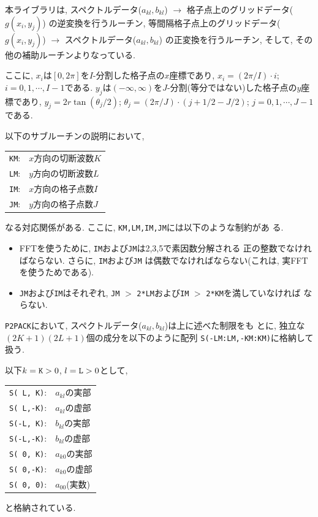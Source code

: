 \documentclass[a4j,fleqn]{jarticle}
\begin{document}
本ライブラリは, 
スペクトルデータ($a_{kl},b_{kl}$) 
$\to$ 格子点上のグリッドデータ($g(x_i,y_j)$) 
の逆変換を行うルーチン,
等間隔格子点上のグリッドデータ($g(x_i,y_j)$) 
$\to$ スペクトルデータ($a_{kl},b_{kl}$) 
の正変換を行うルーチン, 
そして, その他の補助ルーチンよりなっている.

ここに, $x_i$は$[0,2\pi]$を$I$-分割した格子点の$x$座標であり,
$x_i=(2\pi/I)\cdot i$;  $i=0,1,\cdots,I-1$である.
$y_j$は$(-\infty,\infty)$を$J$-分割(等分ではない)した格子点の$y$座標であり,
$y_j=2r\tan(\theta_j/2)$;
$\theta_j=(2\pi/J)\cdot(j+1/2-J/2)$;  $j=0,1,\cdots,J-1$である.

以下のサブルーチンの説明において,
\begin{center}
\begin{tabular}{rl}
{\tt KM}:& $x$方向の切断波数$K$\\
{\tt LM}:& $y$方向の切断波数$L$\\
{\tt IM}:& $x$方向の格子点数$I$\\
{\tt JM}:& $y$方向の格子点数$J$
\end{tabular}
\end{center}
なる対応関係がある. ここに, {\tt KM,LM,IM,JM}には以下のような制約があ
る.

\begin{itemize}
\item FFTを使うために, {\tt IM}および{\tt JM}は2,3,5で素因数分解される
正の整数でなければならない. さらに, {\tt IM}および{\tt JM}
は偶数でなければならない(これは, 実FFTを使うためである).

\item {\tt JM}および{\tt IM}はそれぞれ, 
{\tt JM} $>$ {\tt 2*LM}および{\tt IM} $>$ {\tt 2*KM}を満していなければ
ならない.

\end{itemize}

{\tt P2PACK}において, スペクトルデータ($a_{kl},b_{kl}$)は上に述べた制限をも
とに, 独立な$(2K+1)(2L+1)$個の成分を以下のように配列
{\tt S(-LM:LM,-KM:KM)}に格納して扱う.

以下$k=\mbox{\tt K}>0$, $l=\mbox{\tt L}>0$として,
\begin{center}
\begin{tabular}{ll}
{\tt S( L, K)}:& $a_{kl}$の実部\\
{\tt S( L,-K)}:& $a_{kl}$の虚部\\
{\tt S(-L, K)}:& $b_{kl}$の実部\\
{\tt S(-L,-K)}:& $b_{kl}$の虚部\\
{\tt S( 0, K)}:& $a_{k0}$の実部\\
{\tt S( 0,-K)}:& $a_{k0}$の虚部\\
{\tt S( 0, 0)}:& $a_{00}$(実数)
\end{tabular}
\end{center}
と格納されている.
\end{document}
